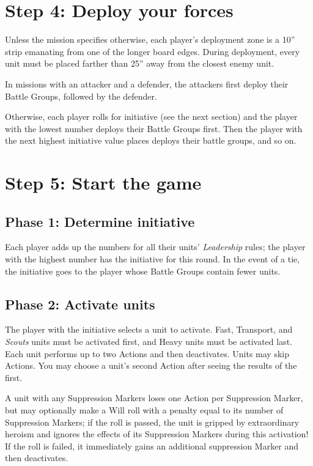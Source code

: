 \begin{multicols}{2}
\section*{Step 4: Deploy your forces}
Unless the mission specifies otherwise, each player's deployment zone is a 10'' strip emanating from one of the longer board edges. During deployment, every unit must be placed farther than 25'' away from the closest enemy unit.

In missions with an attacker and a defender, the attackers first deploy their Battle Groups, followed by the defender.

Otherwise, each player rolls for initiative (see the next section) and the player with the lowest number deploys their Battle Groups first. Then the player with the next highest initiative value places deploys their battle groups, and so on.




\section*{Step 5: Start the game}

\subsection*{Phase 1: Determine initiative}

Each player adds up the numbers for all their units' \textit{Leadership} rules; the player with the highest number has the initiative for this round. In the event of a tie, the initiative goes to the player whose Battle Groups contain fewer units.

\subsection*{Phase 2: Activate units}

The player with the initiative selects a unit to activate. Fast, Transport, and \textit{Scouts} units must be activated first, and Heavy units must be activated last. Each unit performs up to two Actions and then deactivates. Units may skip Actions. You may choose a unit's second Action after seeing the results of the first.

A unit with any Suppression Markers loses one Action per Suppression Marker, but may optionally make a Will roll with a penalty equal to its number of Suppression Markers; if the roll is passed, the unit is gripped by extraordinary heroism and ignores the effects of its Suppression Markers during this activation! If the roll is failed, it immediately gains an additional suppression Marker and then deactivates.


\end{multicols}
